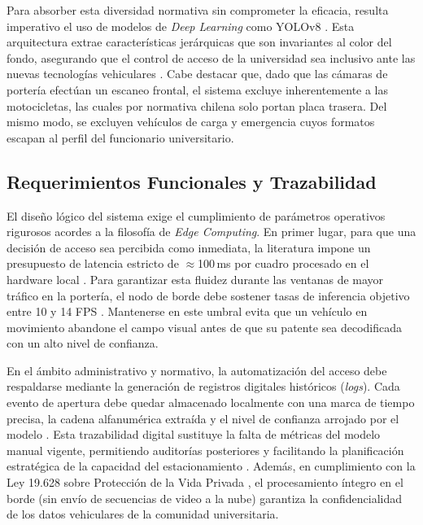 Para absorber esta diversidad normativa sin comprometer la eficacia, resulta imperativo 
el uso de modelos de \textit{Deep Learning} como YOLOv8 \parencite{oluwaseyiComparativeAnalysisYOLOv52025, mobeenRealTimeAutomaticLicense2026}. 
Esta arquitectura extrae características jerárquicas que son invariantes al color del 
fondo, asegurando que el control de acceso de la universidad sea inclusivo ante las 
nuevas tecnologías vehiculares \parencite{larocaAdvancingMultinationalLicense2025}. 
Cabe destacar que, dado que las cámaras de portería efectúan un escaneo frontal, 
el sistema excluye inherentemente a las motocicletas, las cuales por normativa chilena 
solo portan placa trasera. Del mismo modo, se excluyen vehículos de carga y emergencia 
cuyos formatos escapan al perfil del funcionario universitario.

\subsection{Requerimientos Funcionales y Trazabilidad}

El diseño lógico del sistema exige el cumplimiento de parámetros operativos rigurosos 
acordes a la filosofía de \textit{Edge Computing}. En primer lugar, para que una 
decisión de acceso sea percibida como inmediata, la literatura impone un presupuesto de 
latencia estricto de $\approx$100\,ms por cuadro procesado en el hardware local 
\parencite{ammarMultiStageDeepLearningBasedVehicle2023, sonnaraEfficientRealtimeLicense2025}. 
Para garantizar esta fluidez durante las ventanas de mayor tráfico en la portería, el 
nodo de borde debe sostener tasas de inferencia objetivo entre 10 y 14 FPS 
\parencite{sonnaraEfficientRealtimeLicense2025}. Mantenerse en este umbral evita que 
un vehículo en movimiento abandone el campo visual antes de que su patente sea 
decodificada con un alto nivel de confianza.

En el ámbito administrativo y normativo, la automatización del acceso debe respaldarse 
mediante la generación de registros digitales históricos (\textit{logs}). Cada evento 
de apertura debe quedar almacenado localmente con una marca de tiempo precisa, la 
cadena alfanumérica extraída y el nivel de confianza arrojado por el modelo 
\parencite{ammarMultiStageDeepLearningBasedVehicle2023}. Esta trazabilidad digital 
sustituye la falta de métricas del modelo manual vigente, permitiendo auditorías 
posteriores y facilitando la planificación estratégica de la capacidad del 
estacionamiento \parencite{kumarAutomaticNumberPlate2026}. Además, en cumplimiento con 
la Ley 19.628 sobre Protección de la Vida Privada \parencite{nacionalBibliotecaCongresoNacional1999}, 
el procesamiento íntegro en el borde (sin envío de secuencias de video a la nube) garantiza la 
confidencialidad de los datos vehiculares de la comunidad universitaria.

